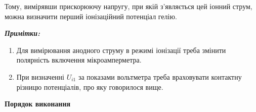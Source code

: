 \documentclass[12pt,a4paper]{article}
\begin{document}
    Тому, вимірявши прискорюючу напругу, при якій з'являється цей іонний струм, можна визначити перший іонізаційний потенціал гелію.

    \vspace{1em}

    \textbf{\textit{Примітки:}}

    \begin{enumerate}
        \item Для вимірювання анодного струму в режимі іонізації треба змінити полярність включення мікроамперметра.
        \item При визначенні $U_{i1}$ за показами вольтметра треба враховувати контактну різницю потенціалів, про яку говорилося вище.
    \end{enumerate}

    \begin{center} \textbf{Порядок виконання} \end{center}
\end{document}
